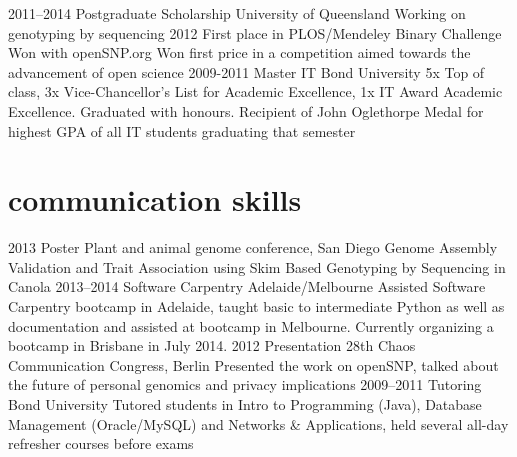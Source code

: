 \documentclass[]{friggeri-cv} %
\begin{document}
\begin{entrylist}
\entry
{2011--2014}
{Postgraduate Scholarship}
{University of Queensland}
{Working on genotyping by sequencing}
\entry
{2012}
{First place in PLOS/Mendeley Binary Challenge}
{Won with openSNP.org}
{Won first price in a competition aimed towards the advancement of open science}
\entry
{2009-2011}
{Master IT}
{Bond University}
{5x Top of class,  3x Vice-Chancellor's List for Academic Excellence, 1x IT Award Academic Excellence. Graduated with honours. Recipient of John Oglethorpe Medal for highest GPA of all IT students graduating that semester}
\end{entrylist}


\newpage
\section{communication skills}

\begin{entrylist}
\entry
{2013}
{Poster}
{Plant and animal genome conference, San Diego}
{Genome Assembly Validation and Trait Association using Skim Based Genotyping by Sequencing in Canola}
\entry
{2013--2014}
{Software Carpentry}
{Adelaide/Melbourne}
{Assisted Software Carpentry bootcamp in Adelaide, taught basic to intermediate Python as well as documentation and assisted at bootcamp in Melbourne. Currently organizing a bootcamp in Brisbane in July 2014.}
\entry
{2012}
{Presentation}
{28th Chaos Communication Congress, Berlin}
{Presented the work on openSNP, talked about the future of personal genomics and privacy implications}
\entry
{2009--2011}
{Tutoring}
{Bond University}
{Tutored students in Intro to Programming (Java), Database Management (Oracle/MySQL) and Networks \& Applications, held several all-day refresher courses before exams}
\end{entrylist}

\end{document}
